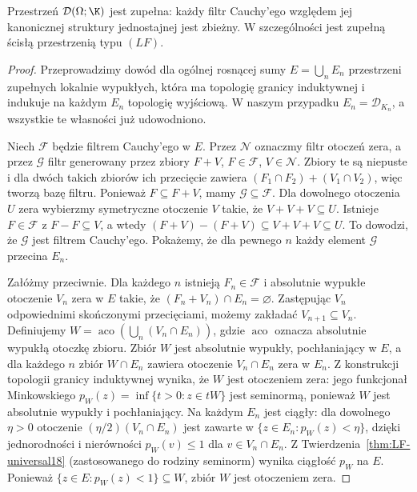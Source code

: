 \begin{twierdzenie}
\label{thm:D-complete18}
Przestrzeń $\mathcal D(\Omega;\K)$ jest zupełna:
każdy filtr Cauchy'ego względem jej kanonicznej struktury
jednostajnej jest zbieżny. W szczególności jest zupełną
ścisłą przestrzenią typu $(LF)$.
\end{twierdzenie}
\begin{proof}
Przeprowadzimy dowód dla ogólnej rosnącej sumy
$E=\bigcup_nE_n$ przestrzeni zupełnych lokalnie wypukłych,
która ma topologię granicy induktywnej i indukuje na
każdym $E_n$ topologię wyjściową. W naszym przypadku
$E_n=\mathcal D_{K_n}$, a wszystkie te własności już
udowodniono.

Niech $\mathcal F$ będzie filtrem Cauchy'ego w $E$.
Przez $\mathcal N$ oznaczmy filtr otoczeń zera, a przez
$\mathcal G$ filtr generowany przez zbiory $F+V$,
$F\in\mathcal F$, $V\in\mathcal N$. Zbiory te są niepuste
i dla dwóch takich zbiorów ich przecięcie zawiera
$(F_1\cap F_2)+(V_1\cap V_2)$, więc tworzą bazę filtru.
Ponieważ $F\subseteq F+V$, mamy $\mathcal G\subseteq\mathcal F$.
Dla dowolnego otoczenia $U$ zera wybierzmy symetryczne
otoczenie $V$ takie, że $V+V+V\subseteq U$.
Istnieje $F\in\mathcal F$ z $F-F\subseteq V$,
a wtedy $(F+V)-(F+V)\subseteq V+V+V\subseteq U$.
To dowodzi, że $\mathcal G$ jest filtrem Cauchy'ego.
Pokażemy, że dla pewnego $n$ każdy element $\mathcal G$
przecina $E_n$.

Załóżmy przeciwnie. Dla każdego $n$ istnieją
$F_n\in\mathcal F$ i absolutnie wypukłe otoczenie
$V_n$ zera w $E$ takie, że
$(F_n+V_n)\cap E_n=\varnothing$. Zastępując $V_n$
odpowiednimi skończonymi przecięciami, możemy zakładać
$V_{n+1}\subseteq V_n$. Definiujemy
$W=\operatorname{aco}(\bigcup_n(V_n\cap E_n))$,
gdzie $\operatorname{aco}$ oznacza absolutnie wypukłą
otoczkę zbioru. Zbiór $W$ jest absolutnie wypukły,
pochłaniający w $E$, a dla każdego $n$ zbiór
$W\cap E_n$ zawiera otoczenie $V_n\cap E_n$ zera w $E_n$.
Z konstrukcji topologii granicy induktywnej wynika, że
$W$ jest otoczeniem zera: jego funkcjonał Minkowskiego
$p_W(z)=\inf\{t>0:z\in tW\}$ jest seminormą,
ponieważ $W$ jest absolutnie wypukły i pochłaniający.
Na każdym $E_n$ jest ciągły: dla dowolnego $\eta>0$
otoczenie $(\eta/2)(V_n\cap E_n)$ jest zawarte
w $\{z\in E_n:p_W(z)<\eta\}$, dzięki jednorodności
i nierówności $p_W(v)\le1$ dla $v\in V_n\cap E_n$.
Z Twierdzenia~\ref{thm:LF-universal18} (zastosowanego
do rodziny seminorm) wynika ciągłość $p_W$ na $E$.
Ponieważ $\{z\in E:p_W(z)<1\}\subseteq W$,
zbiór $W$ jest otoczeniem zera.


\end{proof}
